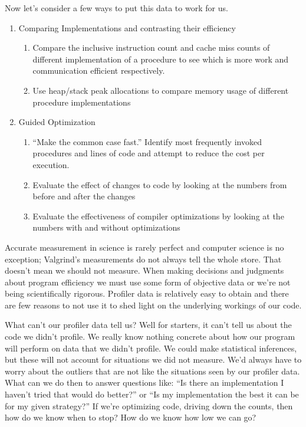 \documentclass[]{tufte-handout}
\begin{document}
Now let's consider a few ways to put this data to work for us.
\begin{enumerate}
\item Comparing Implementations and contrasting their efficiency
\begin{enumerate}
\item Compare the inclusive instruction count and cache miss counts of different implementation of a procedure to see which is more work and communication efficient respectively. 
\item Use heap/stack peak allocations to compare memory usage of different procedure implementations
\end{enumerate}
\item Guided Optimization
\begin{enumerate}
\item ``Make the common case fast.''  Identify most frequently invoked procedures and lines of code and attempt to reduce the cost per execution.  
\item Evaluate the effect of changes to code by looking at the numbers from before and after the changes
\item Evaluate the effectiveness of compiler optimizations by looking at the numbers with and without optimizations
\end{enumerate} 
\end{enumerate}
Accurate measurement in science is rarely perfect and computer science is no exception; Valgrind's measurements do not always tell the whole store.  That doesn't mean we should not measure.  When making decisions and judgments about program efficiency we must use some form of objective data or we're not being scientifically rigorous. Profiler data is relatively easy to obtain and there are few reasons to not use it to shed light on the underlying workings of our code.

What can't our profiler data tell us? Well for starters, it can't tell us about the code we didn't profile.  We really know nothing concrete about how our program will perform on data that we didn't profile. We could make statistical inferences, but these will not account for situations we did not measure. We'd always have to worry about the outliers that are not like the situations seen by our profiler data. What can we do then to answer questions like: ``Is there an implementation I haven't tried that would do better?'' or ``Is my implementation the best it can be for my given strategy?''  If we're optimizing code, driving down the counts, then how do we know when to stop? How do we know how low we can go? 
\end{document}
